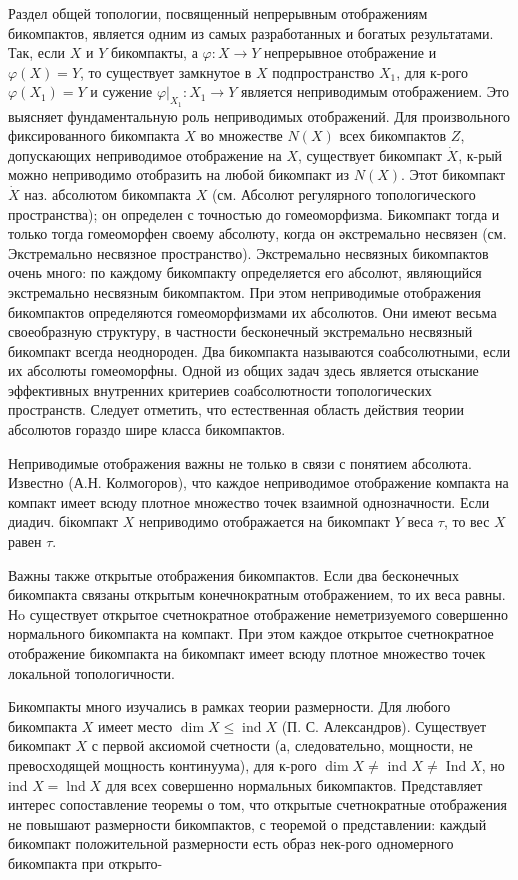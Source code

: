 \documentclass[10pt]{article}
\begin{document}
Раздел общей топологии, посвященный непрерывным отображениям бикомпактов, является одним из самых разработанных и богатых результатами. Так, если $X$ и $Y$ бикомпакты, а $\varphi: X \rightarrow Y$ непрерывное отображение и $\varphi(X)=Y$, то существует замкнутое в $X$ подпространство $X_{1}$, для к-рого $\varphi\left(X_{1}\right)=Y$ и сужение $\left.\varphi\right|_{X_{1}}: X_{1} \rightarrow Y$ является неприводимым отображением. Это выясняет фундаментальную роль неприводимых отображений. Для произвольного фиксированного бикомпакта $X$ во множестве $N(X)$ всех бикомпактов $Z$, допускающих неприводимое отображение на $X$, существует бикомпакт $\dot{X}$, к-рый можно неприводимо отобразить на любой бикомпакт из $N(X)$. Этот бикомпакт $\dot{X}$ наз. абсолютом бикомпакта $X$ (см. Абсолют регулярного топологического пространства); он определен с точностью до гомеоморфизма. Бикомпакт тогда и только тогда гомеоморфен своему абсолюту, когда он әкстремально несвязен (см. Экстремально несвязное пространство). Экстремально несвязных бикомпактов очень много: по каждому бикомпакту определяется его абсолют, являющийся экстремально несвязным бикомпактом. При этом неприводимые отображения бикомпактов определяются гомеоморфизмами их абсолютов. Они имеют весьма своеобразную структуру, в частности бесконечный экстремально несвязный бикомпакт всегда неоднороден. Два бикомпакта называются соабсолютными, если их абсолюты гомеоморфны. Одной из общих задач здесь является отыскание эффективных внутренних критериев соабсолютности топологических пространств. Следует отметить, что естественная область действия теории абсолютов гораздо шире класса бикомпактов.



Неприводимые отображения важны не только в связи с понятием абсолюта. Известно (А.Н. Колмогоров), что каждое неприводимое отображение компакта на компакт имеет всюду плотное множество точек взаимной однозначности. Если диадич. бікомпакт $X$ неприводимо отображается на бикомпакт $Y$ веса $\tau$, то вес $X$ равен $\tau$.



Важны также открытые отображения бикомпактов. Если два бесконечных бикомпакта связаны открытым конечнократным отображением, то их веса равны. Нo существует открытое счетнократное отображение неметризуемого совершенно нормального бикомпакта на компакт. При этом каждое открытое счетнократное отображение бикомпакта на бикомпакт имеет всюду плотное множество точек локальной топологичности.



Бикомпакты много изучались в рамках теории размерности. Для любого бикомпакта $X$ имеет место $\operatorname{dim} X \leqslant \operatorname{ind} X$ (П. С. Александров). Существует бикомпакт $X$ с первой аксиомой счетности (а, следовательно, мощности, не превосходящей мощность континуума), для к-рого $\operatorname{dim} X \neq$ ind $X \neq \operatorname{Ind} X$, но ind $X=\operatorname{lnd} X$ для всех совершенно нормальных бикомпактов. Представляет интерес сопоставление теоремы о том, что открытые счетнократные отображения не повышают размерности бикомпактов, с теоремой о представлении: каждый бикомпакт положительной размерности есть образ нек-рого одномерного бикомпакта при открыто-
\end{document}

